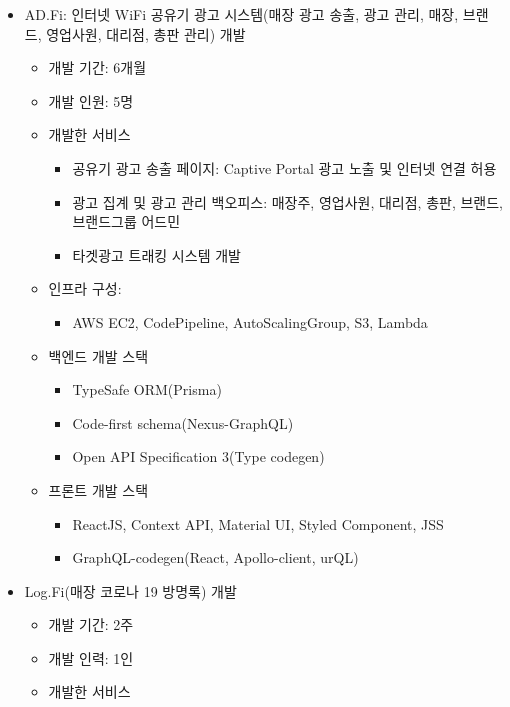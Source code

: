 \documentclass[10pt,a4paper,ragged2e]{altacv}
\begin{document}
\begin{fullwidth}
	\begin{itemize}
		\item AD.Fi: 인터넷 WiFi 공유기 광고 시스템(매장 광고 송출, 광고 관리, 매장, 브랜드, 영업사원, 대리점, 총판 관리) 개발
		\begin{itemize}[label=$\star$]
      \item 개발 기간: 6개월
      \item 개발 인원: 5명
      \item 개발한 서비스
      \begin{itemize}
        \item 공유기 광고 송출 페이지: Captive Portal 광고 노출 및 인터넷 연결 허용
        \item 광고 집계 및 광고 관리 백오피스: 매장주, 영업사원, 대리점, 총판, 브랜드, 브랜드그룹 어드민
        \item 타겟광고 트래킹 시스템 개발
      \end{itemize}
      \item 인프라 구성:
      \begin{itemize}
        \item AWS EC2, CodePipeline, AutoScalingGroup, S3, Lambda
      \end{itemize}
      \item 백엔드 개발 스택
      \begin{itemize}
        \item TypeSafe ORM(Prisma)
        \item Code-first schema(Nexus-GraphQL)
        \item Open API Specification 3(Type codegen)
      \end{itemize}
      \item 프론트 개발 스택
      \begin{itemize}
        \item ReactJS, Context API, Material UI, Styled Component, JSS
        \item GraphQL-codegen(React, Apollo-client, urQL)
      \end{itemize}
    \end{itemize}
		\item Log.Fi(매장 코로나 19 방명록) 개발
		\begin{itemize}[label=$\star$]
      \item 개발 기간: 2주
      \item 개발 인력: 1인
      \item 개발한 서비스

\end{itemize}
\end{itemize}
\end{fullwidth}
\end{document}
